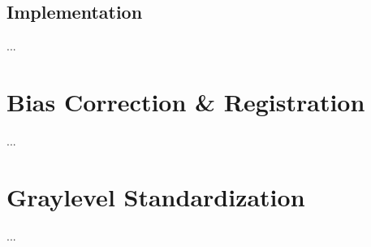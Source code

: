 \subsection{Implementation}
\par...\par
\section{Bias Correction \& Registration}
\par...\par
\section{Graylevel Standardization}
\par...\par
\clearpage
